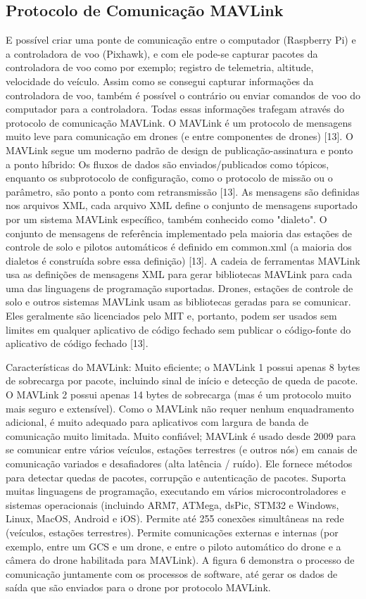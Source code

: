 \subsection{Protocolo de Comunicação MAVLink}
E possível criar uma ponte de comunicação entre o computador (Raspberry Pi) e a controladora de voo (Pixhawk), e com ele pode-se capturar pacotes da controladora de voo como por exemplo; registro de telemetria, altitude, velocidade do veículo.
Assim como se consegui capturar informações da controladora de voo, também é possível o contrário ou enviar comandos de voo do computador para a controladora. Todas essas informações trafegam através do protocolo de comunicação MAVLink.
O MAVLink é um protocolo de mensagens muito leve para comunicação em drones (e entre componentes de drones) [13].
O MAVLink segue um moderno padrão de design de publicação-assinatura e ponto a ponto híbrido: Os fluxos de dados são enviados/publicados como tópicos, enquanto os subprotocolo de configuração, como o protocolo de missão ou o parâmetro, são ponto a ponto com retransmissão [13].
As mensagens são definidas nos arquivos XML, cada arquivo XML define o conjunto de mensagens suportado por um sistema MAVLink específico, também conhecido como "dialeto". O conjunto de mensagens de referência implementado pela maioria das estações de controle de solo e pilotos automáticos é definido em common.xml (a maioria dos dialetos é construída sobre essa definição) [13].
A cadeia de ferramentas MAVLink usa as definições de mensagens XML para gerar bibliotecas MAVLink para cada uma das linguagens de programação suportadas. Drones, estações de controle de solo e outros sistemas MAVLink usam as bibliotecas geradas para se comunicar. Eles geralmente são licenciados pelo MIT e, portanto, podem ser usados sem limites em qualquer aplicativo de código fechado sem publicar o código-fonte do aplicativo de código fechado [13].

Características do MAVLink:
Muito eficiente; o MAVLink 1 possui apenas 8 bytes de sobrecarga por pacote, incluindo sinal de início e detecção de queda de pacote. O MAVLink 2 possui apenas 14 bytes de sobrecarga (mas é um protocolo muito mais seguro e extensível). Como o MAVLink não requer nenhum enquadramento adicional, é muito adequado para aplicativos com largura de banda de comunicação muito limitada.
Muito confiável;  MAVLink é usado desde 2009 para se comunicar entre vários veículos, estações terrestres (e outros nós) em canais de comunicação variados e desafiadores (alta latência / ruído). Ele fornece métodos para detectar quedas de pacotes, corrupção e autenticação de pacotes.
Suporta muitas linguagens de programação, executando em vários microcontroladores e sistemas operacionais (incluindo ARM7, ATMega, dsPic, STM32 e Windows, Linux, MacOS, Android e iOS).
Permite até 255 conexões simultâneas na rede (veículos, estações terrestres).
Permite comunicações externas e internas (por exemplo, entre um GCS e um drone, e entre o piloto automático do drone e a câmera do drone habilitada para MAVLink). A figura 6 demonstra o processo de comunicação juntamente com os processos de software, até gerar os dados de saída que são enviados para o drone por protocolo MAVLink.

